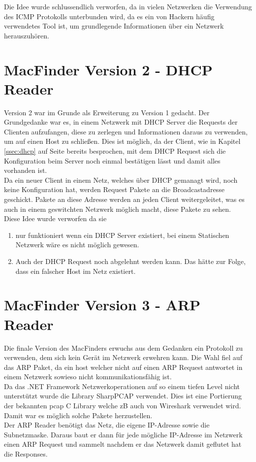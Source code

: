 \documentclass[12pt,a4paper]{report}
\begin{document}
Die Idee wurde schlussendlich verworfen, da in vielen Netzwerken die Verwendung des ICMP Protokolls unterbunden wird, da es ein von Hackern häufig verwendetes Tool ist, um grundlegende Informationen über ein Netzwerk herauszuhören.

\section{MacFinder Version 2 - DHCP Reader}
Version 2 war im Grunde als Erweiterung zu Version 1 gedacht. Der Grundgedanke war es, in einem Netzwerk mit DHCP Server die Requests der Clienten aufzufangen, diese zu zerlegen und Informationen daraus zu verwenden, um auf einen Host zu schließen. Dies ist möglich, da der Client, wie in Kapitel \ref{ssec:dhcp} auf Seite \pageref{ssec:dhcp} bereits besprochen, mit dem DHCP Request sich die Konfiguration beim Server noch einmal bestätigen lässt und damit alles vorhanden ist.\\
Da ein neuer Client in einem Netz, welches über DHCP gemanagt wird, noch keine Konfiguration hat, werden Request Pakete an die Broadcastadresse geschickt. Pakete an diese Adresse werden an jeden Client weitergeleitet, was es auch in einem geswitchten Netzwerk möglich macht, diese Pakete zu sehen.\\

Diese Idee wurde verworfen da sie
\begin{enumerate}
\item nur funktioniert wenn ein DHCP Server existiert, bei einem Statischen Netzwerk wäre es nicht möglich gewesen.
\item Auch der DHCP Request noch abgelehnt werden kann. Das hätte zur Folge, dass ein falscher Host im Netz existiert.
\end{enumerate}

\section{MacFinder Version 3 - ARP Reader}
Die finale Version des MacFinders erwuchs aus dem Gedanken ein Protokoll zu verwenden, dem sich kein Gerät im Netzwerk erwehren kann. Die Wahl fiel auf das ARP Paket, da ein host welcher nicht auf einen ARP Request antwortet in einem Netzwerk sowieso nicht kommunikationsfähig ist.\\
Da das .NET Framework Netzwerkoperationen auf so einem tiefen Level nicht unterstützt wurde die Library SharpPCAP verwendet. Dies ist eine Portierung der bekannten pcap C Library welche zB auch von Wireshark verwendet wird. Damit war es möglich solche Pakete herzustellen.\\
Der ARP Reader benötigt das Netz, die eigene IP-Adresse sowie die Subnetzmaske. Daraus baut er dann für jede mögliche IP-Adresse im Netzwerk einen ARP Request und sammelt nachdem er das Netzwerk damit geflutet hat die Responses.\\
\end{document}

